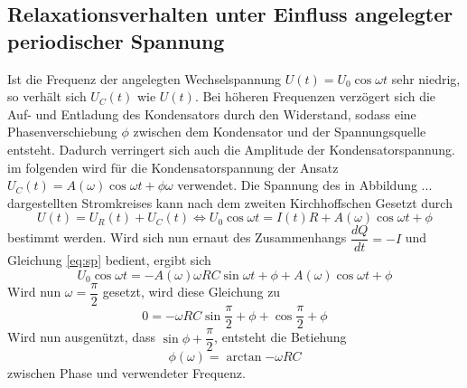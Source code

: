 \subsection{Relaxationsverhalten unter Einfluss angelegter periodischer Spannung}
    Ist die Frequenz der angelegten Wechselspannung $U(t)=U_0\cos{\omega t}$ sehr niedrig,
    so verhält sich $U_C(t)$ wie $U(t)$. Bei höheren Frequenzen verzögert sich 
    die Auf- und Entladung des Kondensators durch den Widerstand, sodass eine 
    Phasenverschiebung $\phi$ zwischen dem Kondensator und der Spannungsquelle 
    entsteht. Dadurch verringert sich auch die Amplitude der Kondensatorspannung.
    im folgenden wird für die Kondensatorspannung der Ansatz $U_C(t)=A(\omega)
    \cos{\omega t + \phi{\omega}}$ verwendet.
    Die Spannung des in Abbildung ... dargestellten Stromkreises kann nach dem zweiten
    Kirchhoffschen Gesetzt durch 
    \begin{equation}
        U(t)=U_R(t)+U_C(t) \Leftrightarrow U_0 \cos{\omega t}=I(t)R + 
        A(\omega)\cos{\omega t + \phi}
    \end{equation}
    bestimmt werden. Wird sich nun ernaut des Zusammenhangs $\dfrac{dQ}{dt}=-I$ und 
    Gleichung \ref{eq:sp} bedient, ergibt sich
    \begin{equation}
        U_0\cos{\omega t}=-A(\omega)\omega RC \sin{\omega t+\phi}+A(\omega)\cos{\omega t + \phi}
    \end{equation}
    Wird nun $\omega=\dfrac{\pi}{2}$ gesetzt, wird diese Gleichung zu 
    \begin{equation*}
        0 = -\omega RC \sin{\dfrac{\pi}{2} + \phi}+\cos{\dfrac{\pi}{2}+\phi}
    \end{equation*}
    Wird nun ausgenützt, dass $\sin{\phi + \dfrac{\pi}{2}}$, entsteht die Betiehung
    \begin{equation}
        \phi(\omega)=\arctan{-\omega RC}
    \end{equation}
    zwischen Phase und verwendeter Frequenz.

